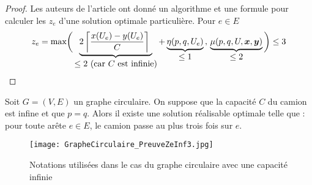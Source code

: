 \begin{proof}
Les auteurs de l'article \cite{Benchimol2011} ont donné un algorithme et une formule pour calculer les $z_e$ d'une solution optimale particulière. Pour $e \in E$
\begin{gather*}
  z_e = \mbox{max}
  \bigg(
    \underbrace{ 2 \left\lceil \frac{x(U_e)-y(U_e)}{C} \right\rceil\ }_{\displaystyle \le 2 \mbox{ (car } C\mbox{ est infinie)} } +
    \underbrace{ \eta(p,q,U_e) }_{\displaystyle \le 1}\,,\,
    \underbrace{ \mu(p,q,U,\bs{x},\bs{y}) }_{\displaystyle \le 2}
  \bigg)
  \le 3
\end{gather*}
\end{proof}

\begin{lem}\label{Ze inf 3 - circulaire}
Soit $G=(V,E)$ un graphe circulaire. On suppose que la capacité $C$ du camion est infine et que $p=q$. Alors il existe une solution réalisable optimale telle que : pour toute arête $e \in E$, le camion passe au plus trois fois sur $e$.
\end{lem}

\begin{figure}[ht]
  \centering
  \texttt{[image: GrapheCirculaire\_PreuveZeInf3.jpg]}
  \caption{Notations utilisées dans le cas du graphe circulaire avec une capacité infinie}
  \label{Notation graphe circulaire preuve Ze inf 3}
\end{figure}

